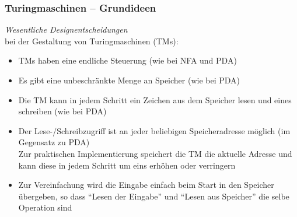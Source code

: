 \documentclass[onlymath]{beamer}
\begin{document}
\begin{frame}\frametitle{Turingmaschinen -- Grundideen}

\emph{Wesentliche Designentscheidungen}\\
bei der Gestaltung von Turingmaschinen (TMs)\pause:
\begin{itemize}
\item TMs haben eine \alert{endliche Steuerung} (wie bei NFA und PDA)\pause
\item Es gibt eine \alert{unbeschränkte Menge an Speicher} (wie bei PDA)\pause
\item Die TM kann in jedem Schritt \alert{ein Zeichen} aus dem Speicher \alert{lesen} und eines \alert{schreiben} (wie bei PDA)\pause
\item Der Lese-/Schreibzugriff ist \alert{an jeder beliebigen Speicheradresse} möglich (im Gegensatz zu PDA)\\[1ex]

Zur praktischen Implementierung speichert die TM die aktuelle Adresse und kann diese in jedem
Schritt um eins erhöhen oder verringern\pause
\item Zur Vereinfachung wird die Eingabe einfach beim Start in den Speicher übergeben, so dass 
"`Lesen der Eingabe"' und "`Lesen aus Speicher"' die selbe Operation sind
\end{itemize}

\end{frame}
\end{document}

